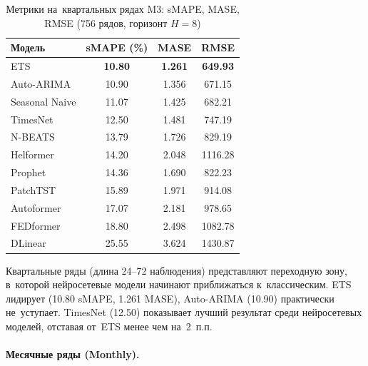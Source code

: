 \begin{table}[H]
\centering
\caption{Метрики на~квартальных рядах M3: sMAPE, MASE, RMSE (756 рядов, горизонт $H{=}8$)}
\label{tab:m3-quarterly-detail}
\small
\begin{tabular}{@{}lccc@{}}
\toprule
Модель & sMAPE (\%) & MASE & RMSE \\
\midrule
ETS            & \textbf{10.80} & \textbf{1.261} & \textbf{649.93} \\
Auto-ARIMA     & 10.90 & 1.356 & 671.15 \\
Seasonal Naive & 11.07 & 1.425 & 682.21 \\
TimesNet       & 12.50 & 1.481 & 747.19 \\
N-BEATS        & 13.79 & 1.726 & 829.19 \\
Helformer      & 14.20 & 2.048 & 1116.28 \\
Prophet        & 14.36 & 1.690 & 822.23 \\
PatchTST       & 15.89 & 1.971 & 914.08 \\
Autoformer     & 17.07 & 2.181 & 978.65 \\
FEDformer      & 18.80 & 2.498 & 1082.78 \\
DLinear        & 25.55 & 3.624 & 1430.87 \\
\bottomrule
\end{tabular}
\end{table}

Квартальные ряды (длина 24--72 наблюдения) представляют переходную зону,
в~которой нейросетевые модели начинают приближаться к~классическим.
ETS лидирует (10.80 sMAPE, 1.261 MASE), Auto-ARIMA (10.90) практически
не~уступает. TimesNet (12.50) показывает лучший результат среди
нейросетевых моделей, отставая от~ETS менее чем на~2~п.п.

\paragraph{Месячные ряды (Monthly).}

